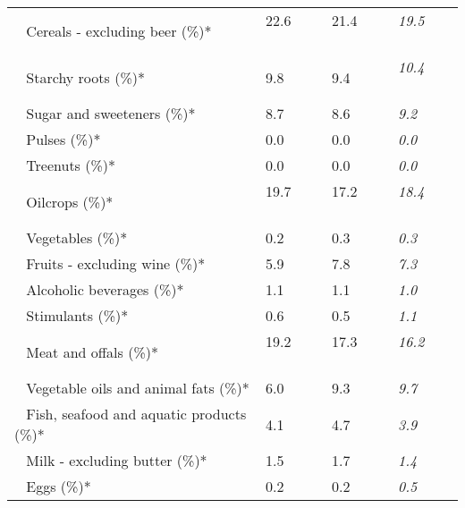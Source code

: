 \begin{tabular}{L{3.9cm} R{1cm} R{1cm} R{1cm}}
	 ~ Cereals - excluding beer (\%)* & 22.6 ~ \ \ & 21.4 ~ \ \ & \textit{19.5} ~ \ \ \\ 
	 ~ Starchy roots (\%)* & 9.8 ~ \ \ & 9.4 ~ \ \ & \textit{10.4} ~ \ \ \\ 
	 ~ Sugar and sweeteners (\%)* & 8.7 ~ \ \ & 8.6 ~ \ \ & \textit{9.2} ~ \ \ \\ 
	 ~ Pulses (\%)* & 0.0 ~ \ \ & 0.0 ~ \ \ & \textit{0.0} ~ \ \ \\ 
	 ~ Treenuts (\%)* & 0.0 ~ \ \ & 0.0 ~ \ \ & \textit{0.0} ~ \ \ \\ 
	 ~ Oilcrops (\%)* & 19.7 ~ \ \ & 17.2 ~ \ \ & \textit{18.4} ~ \ \ \\ 
	 ~ Vegetables (\%)* & 0.2 ~ \ \ & 0.3 ~ \ \ & \textit{0.3} ~ \ \ \\ 
	 ~ Fruits - excluding wine (\%)* & 5.9 ~ \ \ & 7.8 ~ \ \ & \textit{7.3} ~ \ \ \\ 
	 ~ Alcoholic beverages (\%)* & 1.1 ~ \ \ & 1.1 ~ \ \ & \textit{1.0} ~ \ \ \\ 
	 ~ Stimulants (\%)* & 0.6 ~ \ \ & 0.5 ~ \ \ & \textit{1.1} ~ \ \ \\ 
	 ~ Meat and offals (\%)* & 19.2 ~ \ \ & 17.3 ~ \ \ & \textit{16.2} ~ \ \ \\ 
	 ~ Vegetable oils and animal fats (\%)* & 6.0 ~ \ \ & 9.3 ~ \ \ & \textit{9.7} ~ \ \ \\ 
	 ~ Fish, seafood and aquatic products (\%)* & 4.1 ~ \ \ & 4.7 ~ \ \ & \textit{3.9} ~ \ \ \\ 
	 ~ Milk - excluding butter (\%)* & 1.5 ~ \ \ & 1.7 ~ \ \ & \textit{1.4} ~ \ \ \\ 
	 ~ Eggs (\%)* & 0.2 ~ \ \ & 0.2 ~ \ \ & \textit{0.5} ~ \ \ \\ 
       \toprule
      \end{tabular}
      \clearpage
{}
